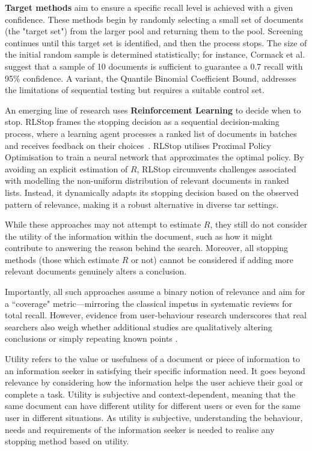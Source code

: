 \documentclass[10pt,oneside]{book}
\begin{document}
\textbf{Target methods} aim to ensure a specific recall level is achieved with a given confidence.  These methods begin by randomly selecting a small set of documents (the "target set") from the larger pool and returning them to the pool.  Screening continues until this target set is identified, and then the process stops.  The size of the initial random sample is determined statistically; for instance, Cormack et al. \cite{cormack_engineering_2016} suggest that a sample of 10 documents is sufficient to guarantee a 0.7 recall with 95\% confidence.  A variant, the Quantile Binomial Coefficient Bound, addresses the limitations of sequential testing  \cite{lewis_certifying_2021} but requires a suitable control set.

An emerging line of research uses \textbf{Reinforcement Learning} to decide when to stop. RLStop frames the stopping decision as a sequential decision-making process, where a learning agent processes a ranked list of documents in batches and receives feedback on their choices~\cite{bin-hezam_rlstop_2024}. RLStop utilises Proximal Policy Optimisation to train a neural network that approximates the optimal policy. By avoiding an explicit estimation of $R$, RLStop circumvents challenges associated with modelling the non-uniform distribution of relevant documents in ranked lists. Instead, it dynamically adapts its stopping decision based on the observed pattern of relevance, making it a robust alternative in diverse \gls*{tar} settings.

While these approaches may not attempt to estimate $R$, they still do not consider the utility of the information within the document, such as how it might contribute to answering the reason behind the search. Moreover, all stopping methods (those which estimate $R$ or not) cannot be considered if adding more relevant documents genuinely alters a conclusion. 

Importantly, all such approaches assume a binary notion of relevance and aim for a ``coverage" metric—mirroring the classical impetus in systematic reviews for total recall. However, evidence from user-behaviour research underscores that real searchers also weigh whether additional studies are qualitatively altering conclusions or simply repeating known points \cite{ilani_analysis_2024, browne_stopping_2005}.

Utility refers to the value or usefulness of a document or piece of information to an information seeker in satisfying their specific information need. It goes beyond relevance by considering how the information helps the user achieve their goal or complete a task. Utility is subjective and context-dependent, meaning that the same document can have different utility for different users or even for the same user in different situations. As utility is subjective, understanding the behaviour, needs and requirements of the information seeker is needed to realise any stopping method based on utility. 
\end{document}
